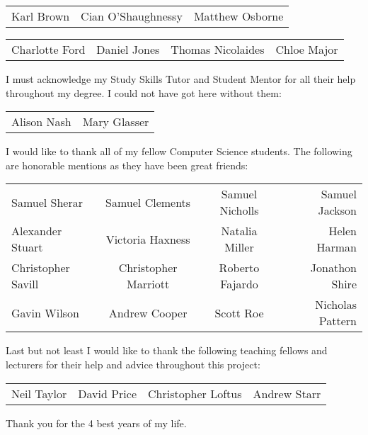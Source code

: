 \begin{center}
\begin{tabular}{ l c r }
Karl Brown & Cian O'Shaughnessy & Matthew Osborne\\
\end{tabular}

\begin{tabular}{ l c c r }
Charlotte Ford & Daniel Jones & Thomas Nicolaides & Chloe Major\\
\end{tabular}

\vspace{3mm}

I must acknowledge my Study Skills Tutor and Student Mentor for all their help throughout my degree. I could not have got here without them:

\begin{tabular}{ l r }
Alison Nash & Mary Glasser\\
\end{tabular}

\vspace{3mm}

I would like to thank all of my fellow Computer Science students. The following are honorable mentions as they have been great friends: 

\begin{tabular}{ l c c r }
Samuel Sherar & Samuel Clements & Samuel Nicholls & Samuel Jackson \\
Alexander Stuart & Victoria Haxness & Natalia Miller & Helen Harman \\
Christopher Savill & Christopher Marriott & Roberto Fajardo & Jonathon Shire \\
Gavin Wilson & Andrew Cooper & Scott Roe & Nicholas Pattern \\ 
\end{tabular}

\vspace{3mm}

Last but not least I would like to thank the following teaching fellows and lecturers for their help and advice throughout this project:

\begin{tabular}{ l c c r }
Neil Taylor & David Price & Christopher Loftus & Andrew Starr\\
\end{tabular}

\vspace{3mm}

Thank you for the 4 best years of my life.
\end{center}